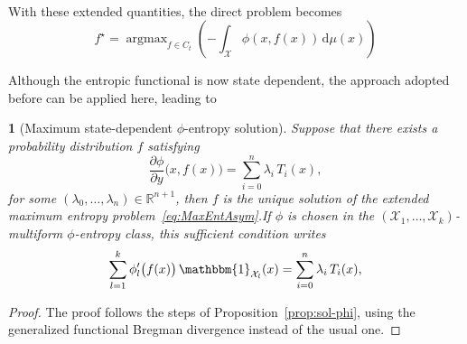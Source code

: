 \documentclass[english,sort&compress]{elsarticle}
\theoremstyle{definition}
\theoremstyle{plain}
\newtheorem{prop}{\protect\propositionname}
\theoremstyle{plain}
\providecommand{\propositionname}{Proposition}
\def\dmu{\mathrm{d}\mu}
\def\Rset{\mathbb{R}}
\def\X{\mathcal{X}}
\def\un{\mathbbm{1}}
\DeclareMathOperator*{\argmax}{\operatorname{argmax}}
\begin{document}
\

With these extended quantities, the direct problem becomes
%
\begin{equation}\label{eq:MaxEntAsym}
f^\star = \argmax_{f \in C_t} \left( - \int_\X \phi(x,f(x)) \, \dmu(x) \right)
\end{equation}

Although the  entropic functional is  now state dependent, the  approach adopted
before can be applied here, leading to

\begin{prop}[Maximum                state-dependent               $\phi$-entropy
  solution]\label{prop:sol-asym_phi}
%
  Suppose that there exists a probability distribution $f$ satisfying
  \begin{equation}\label{eq:sol-asym_phi}
  \frac{\partial \phi}{\partial y}\big(x,f(x)\big) = \sum_{i=0}^n \lambda_i \,
T_i(x),
  \end{equation}
  for  some  $(\lambda_0,\ldots,\lambda_n) \in  \Rset^{n+1}$,  then  $f$ is  the
  unique      solution      of       the      extended      maximum      entropy
  problem~\eqref{eq:MaxEntAsym}.\newline  If $\phi$  is chosen  in the  $(\X_1 ,
  \ldots  , \X_k)$-multiform  $\phi$-entropy  class,  this sufficient  condition
  writes
  \begin{equation}\label{eq:sol-multiform_phi}
  \sum_{l=1}^k \phi_l'\big(f(x)\big) \, \un_{\X_l}(x) =
  \sum_{i=0}^n \lambda_i \, T_i(x),
  \end{equation}
\end{prop}
%
\begin{proof}
  The proof  follows the steps of  Proposition~\ref{prop:sol-phi}, using
  the generalized functional Bregman divergence instead of the usual one.
\end{proof}
\end{document}
